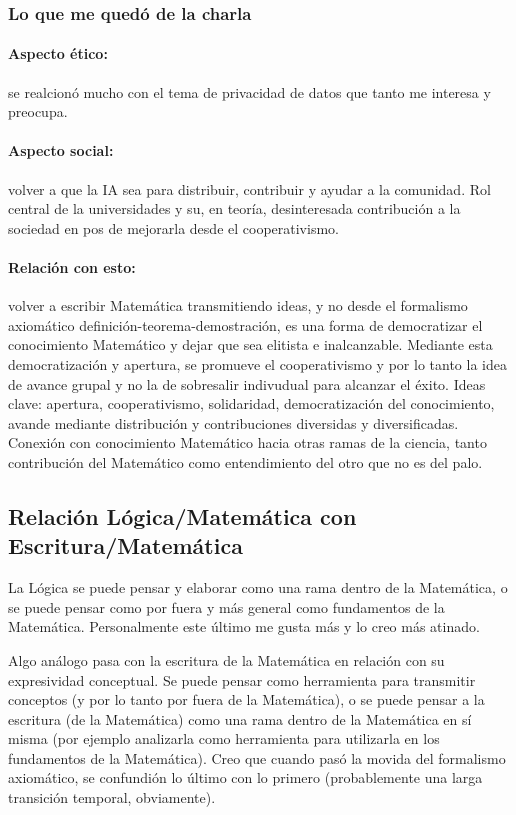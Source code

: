 \documentclass[a4paper,11pt]{article}
\begin{document}
\subsubsection{Lo que me quedó de la charla}
\paragraph{Aspecto ético:} se realcionó mucho con el tema de privacidad de datos que tanto me interesa y preocupa.

\paragraph{Aspecto social:} volver a que la IA sea para distribuir, contribuir y ayudar a la comunidad. Rol central de la universidades y su, en teoría, desinteresada contribución a la sociedad en pos de mejorarla desde el cooperativismo.

\paragraph{Relación con esto:} volver a escribir Matemática transmitiendo ideas, y no desde el formalismo axiomático definición-teorema-demostración, es una forma de democratizar el conocimiento Matemático y dejar que sea elitista e inalcanzable. Mediante esta democratización y apertura, se promueve el cooperativismo y por lo tanto la idea de avance grupal y no la de sobresalir indivudual para alcanzar el éxito. Ideas clave: apertura, cooperativismo, solidaridad, democratización del conocimiento, avande mediante distribución y contribuciones diversidas y diversificadas. Conexión con conocimiento Matemático hacia otras ramas de la ciencia, tanto contribución del Matemático como entendimiento del otro que no es del palo.

\subsection{Relación Lógica/Matemática con Escritura/Matemática}
La Lógica se puede pensar y elaborar como una rama dentro de la Matemática, o se puede pensar como por fuera y más general como fundamentos de la Matemática. Personalmente este último me gusta más y lo creo más atinado.

Algo análogo pasa con la escritura de la Matemática en relación con su expresividad conceptual. Se puede pensar como herramienta para transmitir conceptos (y por lo tanto por fuera de la Matemática), o se puede pensar a la escritura (de la Matemática) como una rama dentro de la Matemática en sí misma (por ejemplo analizarla como herramienta para utilizarla en los fundamentos de la Matemática). Creo que cuando pasó la movida del formalismo axiomático, se confundión lo último con lo primero (probablemente una larga transición temporal, obviamente).
\end{document}
